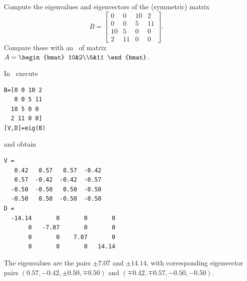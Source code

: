 \begin{example} \label{eg:eigsvd}
Compute the eigenvalues and eigenvectors of the (symmetric) matrix
\begin{equation*}
B=\begin{bmatrix} 0&0&10&2\\
0&0&5&11\\
10&5&0&0\\
2&11&0&0 \end{bmatrix}.
\end{equation*}
Compare these with an \svd\ of matrix \(A=\begin{bmat} 10&2\\5&11 \end{bmat}\).
\begin{solution} In \script\ execute
\setbox\ajrqrbox\hbox{}%
\marginajrbox%
\begin{verbatim}
B=[0 0 10 2
   0 0 5 11
  10 5 0 0
  2 11 0 0]
[V,D]=eig(B)
\end{verbatim}
and obtain \twodp
\begin{verbatim}
V =
   0.42   0.57   0.57  -0.42
   0.57  -0.42  -0.42  -0.57
  -0.50  -0.50   0.50  -0.50
  -0.50   0.50  -0.50  -0.50
D =
  -14.14       0       0       0
       0   -7.07       0       0
       0       0    7.07       0
       0       0       0   14.14
\end{verbatim}
The eigenvalues are the pairs \(\pm7.07\) and \(\pm14.14\), with corresponding eigenvector pairs \((0.57,-0.42,\pm0.50,\mp0.50)\) and \((\mp0.42,\mp0.57,-0.50,-0.50)\).



\end{solution}
\end{example}

